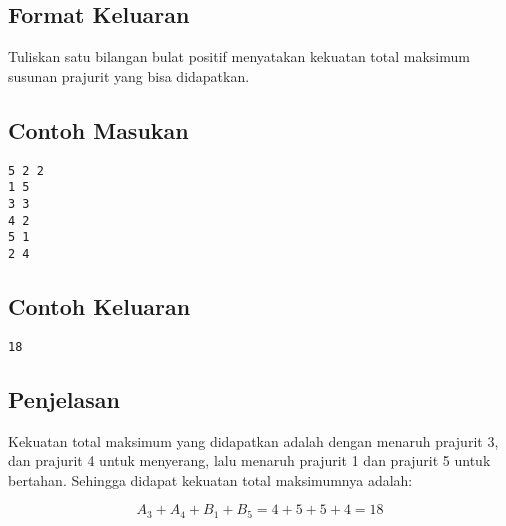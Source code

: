\documentclass{article}
\begin{document}
\subsection*{Format Keluaran}

Tuliskan satu bilangan bulat positif menyatakan kekuatan total maksimum susunan prajurit yang bisa didapatkan.
\\

\begin{multicols}{2}
\subsection*{Contoh Masukan}
\begin{lstlisting}
5 2 2
1 5
3 3
4 2
5 1
2 4
\end{lstlisting}
\columnbreak
\subsection*{Contoh Keluaran}
\begin{lstlisting}
18
\end{lstlisting}
\vfill
\null
\end{multicols}

\subsection*{Penjelasan}

Kekuatan total maksimum yang didapatkan adalah dengan menaruh prajurit 3, dan prajurit 4 untuk menyerang, lalu menaruh prajurit 1 dan prajurit 5 untuk bertahan. Sehingga didapat kekuatan total maksimumnya adalah:

$$A_3+A_4+B_1+B_5=4+5+5+4=18$$

\pagebreak
\end{document}
